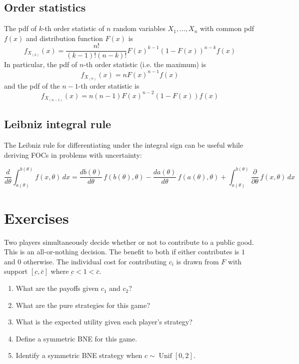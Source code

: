 \documentclass[10pt]{article}
\begin{document}
\begin{spacing}{1.0}
\subsection{Order statistics}

\begin{definition}
  The pdf of $k$-th order statistic of $n$ random variables $X_1, \ldots, X_n$
  with common pdf $f(x)$ and distribution function $F(x)$ is \[f_{X_{(k)}}(x) =
  \frac{n!}{(k-1)!(n-k)!}F(x)^{k-1}\left(1-F(x)\right)^{n-k} f(x)\] In
  particular, the pdf of $n$-th order statistic (i.e. the maximum)
  is \[f_{X_{(n)}}(x) = n F(x)^{n-1} f(x)\] and the pdf of the $n-1$-th order
  statistic is \[f_{X_{(n-1)}}(x) = n(n-1) F(x)^{n-2} \left(1-F(x)\right) f(x)\]
\end{definition}

\subsection{Leibniz integral rule}

The Leibniz rule for differentiating under the integral sign can be useful while
deriving FOCs in problems with uncertainty:

\[\frac{d}{d\theta}\int_{a(\theta)}^{b(\theta)} f(x,\theta)\,dx = \frac{d b(\theta)}{d \theta}\,f(b(\theta),\theta)-\frac{d a(\theta)}{d \theta}\,f(a(\theta),\theta)+ \int_{a(\theta)}^{b(\theta)}\frac{\partial}{\partial \theta}\,f(x,\theta)\,dx\]

\newpage

\section{Exercises}

\begin{exercise}
  Two players simultaneously decide whether or not to contribute to a public
  good. This is an all-or-nothing decision. The benefit to both if either
  contributes is $1$ and $0$ otherwise. The individual cost for contributing
  $c_i$ is drawn from $F$ with support $[\underbar{c}, \bar{c}]$ where $\underbar{c}
  < 1 < \bar{c}$.
  \begin{enumerate}
  \item What are the payoffs given $c_1$ and $c_2$?
  \item What are the pure strategies for this game?
  \item What is the expected utility given each player's strategy?
  \item Define a symmetric BNE for this game.
  \item Identify a symmetric BNE strategy when $c \sim \operatorname{Unif}[0,2]$.
  \end{enumerate}
\end{exercise}


\end{spacing}
\end{document}
